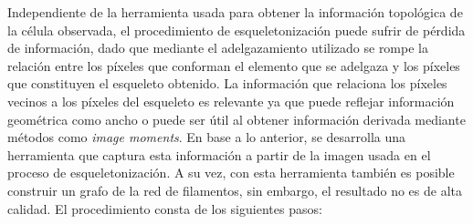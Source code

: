 Independiente de la herramienta usada para obtener la informaci\'on topol\'ogica de la c\'elula observada, el procedimiento de esqueletonizaci\'on puede sufrir de p\'erdida de informaci\'on, dado que mediante el adelgazamiento utilizado se rompe la relaci\'on entre los p\'ixeles que conforman el elemento que se adelgaza y los p\'ixeles que constituyen el esqueleto obtenido. La informaci\'on que relaciona los p\'ixeles vecinos a los p\'ixeles del esqueleto es relevante ya que puede reflejar informaci\'on geom\'etrica como ancho o puede ser \'util al obtener informaci\'on derivada mediante m\'etodos como {\it image moments}\cite{flusser2009moments}\cite{chaumette2004image}. En base a lo anterior, se desarrolla una herramienta que captura esta informaci\'on a partir de la imagen usada en el proceso de esqueletonizaci\'on. A su vez, con esta herramienta tambi\'en es posible construir un grafo de la red de filamentos, sin embargo, el resultado no es de alta calidad. El procedimiento consta de los siguientes pasos:


